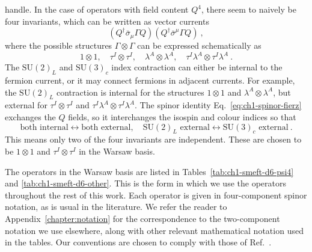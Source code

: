 handle. In the case of operators with field content $Q^{4}$, there seem to
naively be four invariants, which can be written as vector currents
\begin{equation}
  (Q^{\dagger} \bar{\sigma}_{\mu} \Gamma Q) (Q^{\dagger} \bar{\sigma}^{\mu} \Gamma Q) \ ,
\end{equation}
where the possible structures $\Gamma \otimes \Gamma$ can be expressed schematically as
\begin{equation}
  1 \otimes 1,\quad \tau^{I} \otimes \tau^{I},\quad \lambda^{A} \otimes \lambda^{A},\quad \tau^{I} \lambda^{A} \otimes \tau^{I} \lambda^{A} \ .
\end{equation}
The $\mathrm{SU}(2)_{L}$ and $\mathrm{SU}(3)_{c}$ index contraction can either
be internal to the fermion current, or it may connect fermions in adjacent
currents. For example, the $\mathrm{SU}(2)_{L}$ contraction is internal for the
structures $1 \otimes 1$ and $\lambda^{A} \otimes \lambda^{A}$, but external for
$\tau^{I} \otimes \tau^{I}$ and
$\tau^{I} \lambda^{A} \otimes \tau^{I} \lambda^{A}$. The spinor identity
Eq.~\eqref{eq:ch1-spinor-fierz} exchanges the $Q$ fields, so it interchanges the
isospin and colour indices so that
\begin{equation}
  \text{both internal} \leftrightarrow \text{both external},\quad \mathrm{SU}(2)_{L} \text{ external} \leftrightarrow \mathrm{SU}(3)_{c} \text{ external} \ .
\end{equation}
This means only two of the four invariants are independent. These are chosen to
be $1 \otimes 1$ and $\tau^{I} \otimes \tau^{I}$ in the Warsaw basis.

The operators in the Warsaw basis are listed in Tables~\ref{tab:ch1-smeft-d6-psi4}
and \ref{tab:ch1-smeft-d6-other}. This is the form in which we use the operators
throughout the rest of this work. Each operator is given in four-component
spinor notation, as is usual in the literature. We refer the reader to
Appendix~\ref{chapter:notation} for the correspondence to the two-component
notation we use elsewhere, along with other relevant mathematical notation used
in the tables. Our conventions are chosen to comply with those of
Ref.~\cite{Aebischer:2017ugx}.


